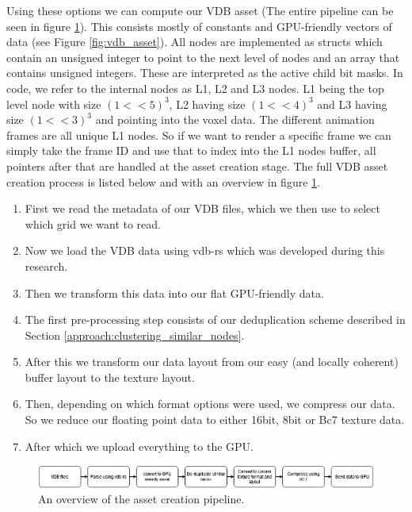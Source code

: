Using these options we can compute our VDB asset (The entire pipeline can be seen in figure \ref{fig:vdb_asset_pipeline}). This consists mostly of constants and GPU-friendly vectors of data (see Figure \ref{fig:vdb_asset}). All nodes are implemented as structs which contain an unsigned integer to point to the next level of nodes and an array that contains unsigned integers. These are interpreted as the active child bit masks. In code, we refer to the internal nodes as L1, L2 and L3 nodes. L1 being the top level node with size $(1 << 5)^3$, L2 having size $(1 << 4)^3$ and L3 having size $(1 << 3)^3$ and pointing into the voxel data. The different animation frames are all unique L1 nodes. So if we want to render a specific frame we can simply take the frame ID and use that to index into the L1 nodes buffer, all pointers after that are handled at the asset creation stage. The full VDB asset creation process is listed below and with an overview in figure \ref{fig:vdb_asset_pipeline}.
\begin{enumerate}
    \itemsep0em 
    \item First we read the metadata of our VDB files, which we then use to select which grid we want to read.
    \item Now we load the VDB data using vdb-rs \cite{VDBRS} which was developed during this research.
    \item Then we transform this data into our flat GPU-friendly data.
    \item The first pre-processing step consists of our deduplication scheme described in Section \ref{approach:clustering_similar_nodes}.
    \item After this we transform our data layout from our easy (and locally coherent) buffer layout to the texture layout.
    \item Then, depending on which format options were used, we compress our data. So we reduce our floating point data to either 16bit, 8bit or Bc7 texture data.
    \item After which we upload everything to the GPU.
\end{enumerate}

\begin{figure}[H]
    \centering
    \includegraphics[width=0.9\linewidth]{figures/VDB asset pipeline.png}
    \caption{An overview of the asset creation pipeline.}
    \label{fig:vdb_asset_pipeline}
\end{figure}



